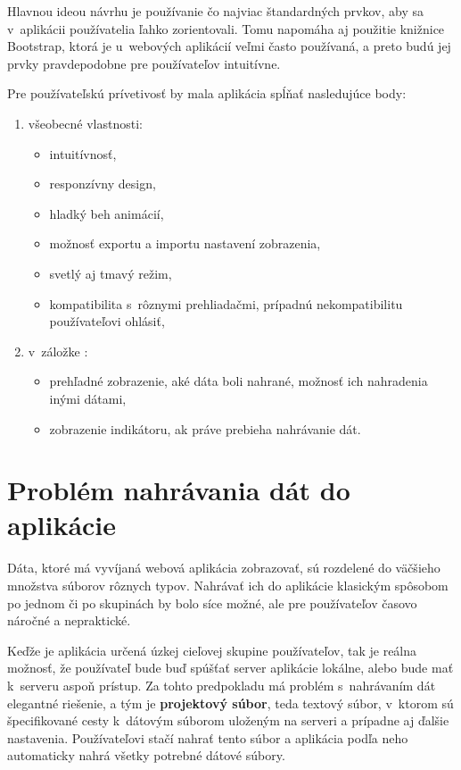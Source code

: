Hlavnou ideou návrhu je používanie čo najviac štandardných prvkov, aby sa v~aplikácii používatelia ľahko zorientovali. Tomu napomáha aj použitie knižnice Bootstrap, ktorá je u~webových aplikácií veľmi často používaná, a preto budú jej prvky pravdepodobne pre používateľov intuitívne.

Pre používateľskú prívetivosť by mala aplikácia spĺňať nasledujúce body:

\begin{enumerate}
    \item všeobecné vlastnosti:
    \begin{itemize}
        \item intuitívnosť,
        \item responzívny design,
        \item hladký beh animácií,
        \item možnosť exportu a importu nastavení zobrazenia,
        \item svetlý aj tmavý režim,
        \item kompatibilita s~rôznymi prehliadačmi, prípadnú nekompatibilitu používateľovi ohlásiť,
    \end{itemize}
    \item v~záložke :
    \begin{itemize}
        \item prehľadné zobrazenie, aké dáta boli nahrané, možnosť ich nahradenia inými dátami,
        \item zobrazenie indikátoru, ak práve prebieha nahrávanie dát.
    \end{itemize}
\end{enumerate}

\section{Problém nahrávania dát do aplikácie}

Dáta, ktoré má vyvíjaná webová aplikácia zobrazovať, sú rozdelené do väčšieho množstva súborov rôznych typov. Nahrávať ich do aplikácie klasickým spôsobom po jednom či po skupinách by bolo síce možné, ale pre používateľov časovo náročné a nepraktické.

Keďže je aplikácia určená úzkej cieľovej skupine používateľov, tak je reálna možnosť, že používateľ bude buď spúšťať server aplikácie lokálne, alebo bude mať k~serveru aspoň prístup. Za tohto predpokladu má problém s~nahrávaním dát elegantné riešenie, a tým je \textbf{projektový súbor}, teda textový súbor, v~ktorom sú špecifikované cesty k~dátovým súborom uloženým na serveri a prípadne aj ďalšie nastavenia. Používateľovi stačí nahrať tento súbor a aplikácia podľa neho automaticky nahrá všetky potrebné dátové súbory.

